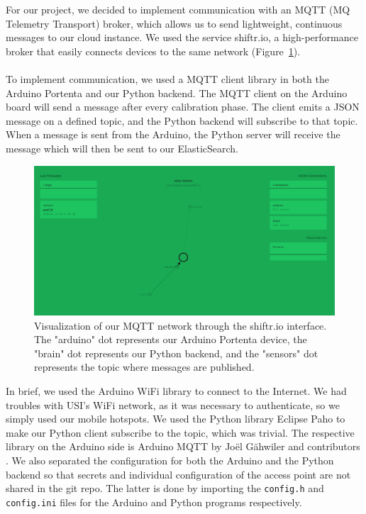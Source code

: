 For our project, we decided to implement communication with an MQTT (MQ Telemetry Transport) broker, which allows us to send lightweight, continuous messages to our cloud instance.
We used the service shiftr.io, a high-performance broker that easily connects devices to the same network (Figure~\ref{fig:shiftrviz}). \\ \\
To implement communication, we used a MQTT client library in both the Arduino Portenta and our Python backend.
The MQTT client on the Arduino board will send a message after every calibration phase.
The client emits a JSON message on a defined topic, and the Python backend will subscribe to that topic.
When a message is sent from the Arduino, the Python server will receive the message which will then be sent to our ElasticSearch.
\begin{figure}[H]
    \centering
    \includegraphics[width=15cm]{../assets/png/shiftr-network}
    \caption{Visualization of our MQTT network through the shiftr.io interface. The "arduino" dot represents our Arduino Portenta device, the "brain" dot represents our Python backend, and the "sensors" dot represents the topic where messages are published.}
    \label{fig:shiftrviz}
\end{figure}
In brief, we used the Arduino WiFi library to connect to the Internet. We had
troubles with USI's WiFi network, as it was necessary to authenticate, so we
simply used our mobile hotspots. We used the Python library Eclipse Paho
\cite{paho} to make our Python client subscribe to the topic, which was trivial.
The respective library on the Arduino side is Arduino MQTT by Joël Gähwiler and
contributors \cite{arduinomqtt}. We also separated the configuration for both
the Arduino and the Python backend so that secrets and individual configuration
of the access point are not shared in the git repo. The latter is done by
importing the \texttt{config.h} and \texttt{config.ini} files for the Arduino
and Python programs respectively.

